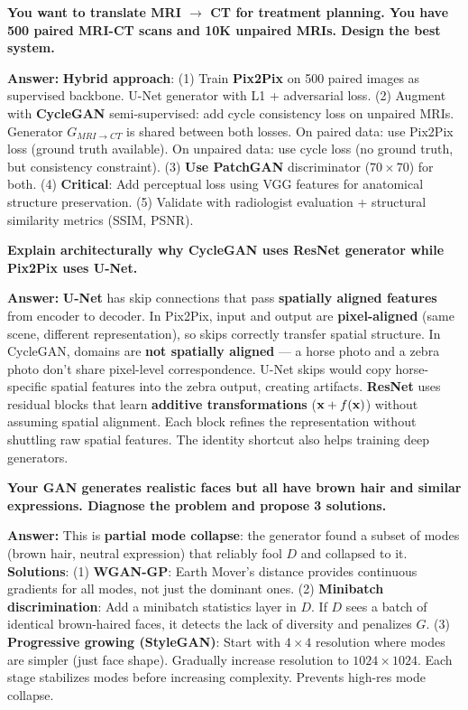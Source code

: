 \begin{examq}
\textbf{You want to translate MRI $\to$ CT for treatment planning. You have 500 paired MRI-CT scans and 10K unpaired MRIs. Design the best system.}

\textbf{Answer:} \textbf{Hybrid approach}: (1) Train \textbf{Pix2Pix} on 500 paired images as supervised backbone. U-Net generator with L1 + adversarial loss. (2) Augment with \textbf{CycleGAN} semi-supervised: add cycle consistency loss on unpaired MRIs. Generator $G_{MRI\to CT}$ is shared between both losses. On paired data: use Pix2Pix loss (ground truth available). On unpaired data: use cycle loss (no ground truth, but consistency constraint). (3) \textbf{Use PatchGAN} discriminator ($70{\times}70$) for both. (4) \textbf{Critical}: Add perceptual loss using VGG features for anatomical structure preservation. (5) Validate with radiologist evaluation + structural similarity metrics (SSIM, PSNR).
\end{examq}

\begin{examq}
\textbf{Explain architecturally why CycleGAN uses ResNet generator while Pix2Pix uses U-Net.}

\textbf{Answer:} \textbf{U-Net} has skip connections that pass \textbf{spatially aligned features} from encoder to decoder. In Pix2Pix, input and output are \textbf{pixel-aligned} (same scene, different representation), so skips correctly transfer spatial structure. In CycleGAN, domains are \textbf{not spatially aligned} — a horse photo and a zebra photo don't share pixel-level correspondence. U-Net skips would copy horse-specific spatial features into the zebra output, creating artifacts. \textbf{ResNet} uses residual blocks that learn \textbf{additive transformations} ($\mathbf{x} + f(\mathbf{x})$) without assuming spatial alignment. Each block refines the representation without shuttling raw spatial features. The identity shortcut also helps training deep generators.
\end{examq}

\begin{examq}
\textbf{Your GAN generates realistic faces but all have brown hair and similar expressions. Diagnose the problem and propose 3 solutions.}

\textbf{Answer:} This is \textbf{partial mode collapse}: the generator found a subset of modes (brown hair, neutral expression) that reliably fool $D$ and collapsed to it. \textbf{Solutions}: (1) \textbf{WGAN-GP}: Earth Mover's distance provides continuous gradients for all modes, not just the dominant ones. (2) \textbf{Minibatch discrimination}: Add a minibatch statistics layer in $D$. If $D$ sees a batch of identical brown-haired faces, it detects the lack of diversity and penalizes $G$. (3) \textbf{Progressive growing (StyleGAN)}: Start with $4{\times}4$ resolution where modes are simpler (just face shape). Gradually increase resolution to $1024{\times}1024$. Each stage stabilizes modes before increasing complexity. Prevents high-res mode collapse.
\end{examq}

